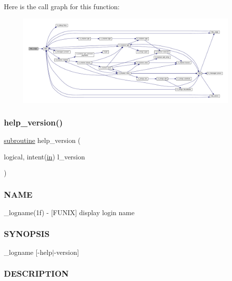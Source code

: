 Here is the call graph for this function\+:
\nopagebreak
\begin{figure}[H]
\begin{center}
\leavevmode
\includegraphics[width=350pt]{__logname_8f90_a3e09a3b52ee8fb04eeb93fe5761626a8_cgraph}
\end{center}
\end{figure}
\mbox{\label{__logname_8f90_a39c21619b08a3c22f19e2306efd7f766}} 
\subsubsection{\texorpdfstring{help\+\_\+version()}{help\_version()}}
{\footnotesize\ttfamily \hyperlink{M__stopwatch_83_8txt_acfbcff50169d691ff02d4a123ed70482}{subroutine} help\+\_\+version (\begin{DoxyParamCaption}\item[{logical, intent(\hyperlink{M__journal_83_8txt_afce72651d1eed785a2132bee863b2f38}{in})}]{l\+\_\+version }\end{DoxyParamCaption})}



\subsubsection*{N\+A\+ME}

\+\_\+logname(1f) -\/ \mbox{[}F\+U\+N\+IX\mbox{]} display login name \subsubsection*{S\+Y\+N\+O\+P\+S\+IS}

\+\_\+logname \mbox{[}-\/help$\vert$-\/version\mbox{]} \subsubsection*{D\+E\+S\+C\+R\+I\+P\+T\+I\+ON}

